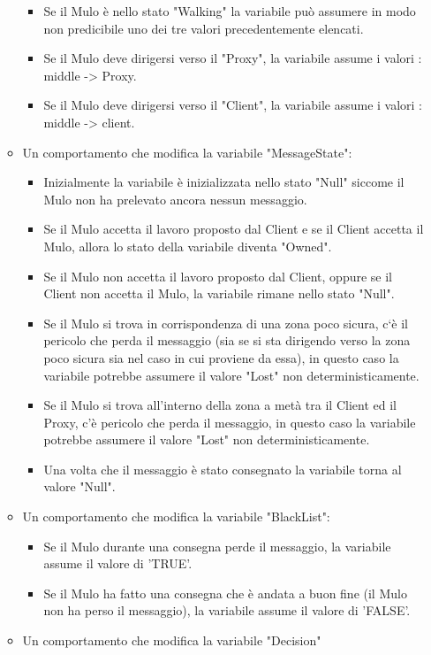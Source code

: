 \documentclass[13pt,a4paper]{article}
\begin{document}
\begin{itemize}
\begin{itemize}
		\begin{itemize}
			\item Se il Mulo è nello stato "Walking" la variabile può assumere in modo non predicibile uno dei tre valori precedentemente elencati. 
			\item Se il Mulo deve dirigersi verso il "Proxy", la variabile assume i valori : middle -> Proxy.
			\item Se il Mulo deve dirigersi verso il "Client", la variabile assume i valori : middle -> client.
		\end{itemize}
	\item Un comportamento che modifica la variabile "MessageState":
	\begin{itemize}
		\item Inizialmente la variabile è inizializzata nello stato "Null" siccome il Mulo non ha prelevato ancora nessun messaggio.
		\item Se il Mulo accetta il lavoro proposto dal Client e se il Client  accetta il Mulo, allora lo stato della variabile diventa "Owned".
		\item Se il Mulo non accetta il lavoro proposto dal Client, oppure se il Client non accetta il Mulo,  la variabile rimane nello stato "Null".
		\item Se il Mulo si trova in corrispondenza di una zona poco sicura, c`è il pericolo che  perda il messaggio (sia se si sta dirigendo verso la zona poco sicura  sia nel caso in cui proviene da essa), in questo caso la variabile potrebbe assumere il valore "Lost" non deterministicamente.
		\item Se il Mulo si trova all'interno della zona a metà tra il Client ed il Proxy, c'è pericolo che perda il messaggio, in questo caso la variabile potrebbe assumere il valore "Lost" non deterministicamente.
		\item Una volta che il messaggio è stato consegnato la variabile torna al valore "Null".
	\end{itemize}
	\item Un comportamento che modifica la variabile "BlackList":
	\begin{itemize}
		\item Se il Mulo durante una consegna perde il messaggio, la variabile assume il valore di 'TRUE'.
		\item Se il Mulo ha fatto una consegna che è andata a buon fine (il Mulo non ha perso il messaggio), la variabile assume il valore di 'FALSE'.
	\end{itemize} 
	\item Un comportamento che modifica la variabile "Decision"

\end{itemize}
\end{itemize}
\end{document}
